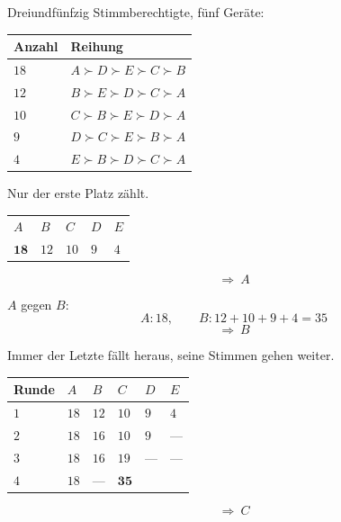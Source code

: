 \begin{merksatz}
Dreiundfünfzig Stimmberechtigte, fünf Geräte:

\begin{center}
{\small
\renewcommand{\arraystretch}{1.5}
\begin{tabular}{@{}P{1.6cm}P{5.0cm}@{}}
\toprule
\textbf{Anzahl} & \textbf{Reihung}\\
\midrule
$18$ & $A \succ D \succ E \succ C \succ B$\\
$12$ & $B \succ E \succ D \succ C \succ A$\\
$10$ & $C \succ B \succ E \succ D \succ A$\\
$9$ & $D \succ C \succ E \succ B \succ A$\\
$4$ & $E \succ B \succ D \succ C \succ A$\\
\bottomrule
\end{tabular}}
\end{center}

Nur der erste Platz zählt.
\begin{center}
{\small
\renewcommand{\arraystretch}{1.44}
\begin{tabular}{@{}P{1.2cm}P{1.2cm}P{1.2cm}P{1.2cm}P{1.2cm}@{}}
\toprule
$A$ & $B$ & $C$ & $D$ & $E$\\
$\mathbf{18}$ & $12$ & $10$ & $9$ & $4$\\
\bottomrule
\end{tabular}}
\end{center}
\[ \Longrightarrow\ A \]

$A$ gegen $B$:
\[ A: 18, \qquad B: 12+10+9+4 = 35 \]
\[ \Longrightarrow\ B \]

Immer der Letzte fällt heraus, seine Stimmen gehen weiter.
\begin{center}
{\small
\renewcommand{\arraystretch}{1.44}
\begin{tabular}{@{}P{1.6cm}P{1.2cm}P{1.2cm}P{1.2cm}P{1.2cm}P{1.2cm}@{}}
\toprule
\textbf{Runde} & $A$ & $B$ & $C$ & $D$ & $E$\\
\midrule
$1$ & $18$ & $12$ & $10$ & $9$ & $4$\\
$2$ & $18$ & $16$ & $10$ & $9$ & ---\\
$3$ & $18$ & $16$ & $19$ & --- & ---\\
$4$ & $18$ & --- & $\mathbf{35}$ & & \\
\bottomrule
\end{tabular}}
\end{center}
\[ \Longrightarrow\ C \]


\end{merksatz}
